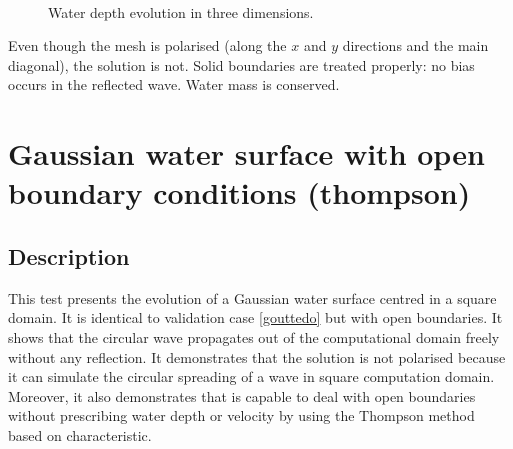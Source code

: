 \begin{figure}[!htbp]
\begin{minipage}[t]{0.50\textwidth}
 \centering
\end{minipage}
\begin{minipage}[t]{0.50\textwidth}
 \centering
\end{minipage}\\
\begin{minipage}[t]{0.50\textwidth}
 \centering
\end{minipage}
\begin{minipage}[t]{0.50\textwidth}
 \centering
\end{minipage}
\begin{minipage}[t]{0.50\textwidth}
 \centering
\end{minipage}
\begin{minipage}[t]{0.50\textwidth}
 \centering
\end{minipage}
 \caption{Water depth evolution in three dimensions.}
 \label{t3d:gouttedo:fig:depth_evol3D}
\end{figure}


\bigskip
Even though the mesh is polarised (along the $x$ and $y$ directions and
the main diagonal), the solution is not.
Solid boundaries are treated properly: no bias occurs in the reflected
wave. Water mass is conserved.


\chapter{Gaussian water surface with open boundary conditions (thompson)}

\section{Description}
\bigskip
This test presents the evolution of a Gaussian water surface centred
in a square domain.
It is identical to validation case \ref{gouttedo} but with open boundaries.
It shows that the circular wave propagates out of the computational
domain freely without any reflection.
It demonstrates that the  solution is not polarised because
it can simulate the circular spreading of a wave in square computation
domain.
Moreover, it also demonstrates that  is capable to deal
with open boundaries without prescribing water depth or velocity by
using the Thompson method based on characteristic.

